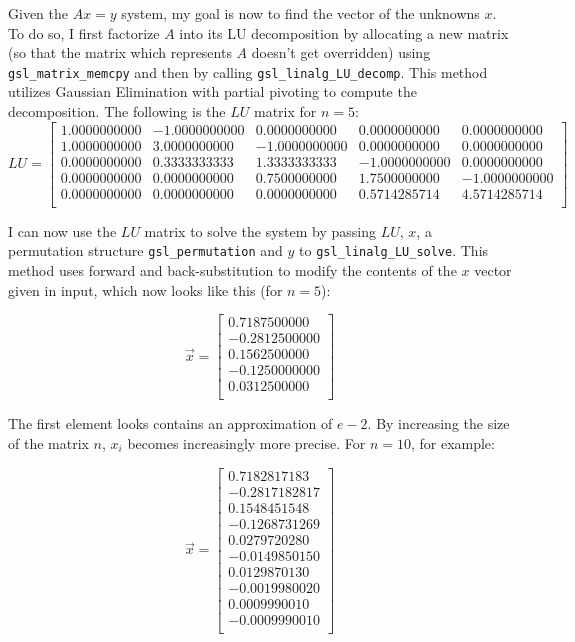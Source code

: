 \documentclass{article}
\newcommand{\code}{\texttt}
\begin{document}
Given the $Ax=y$ system, my goal is now to find the vector of the unknowns $x$. To do so, I first factorize $A$ into its LU decomposition by allocating a new matrix (so that the matrix which represents $A$ doesn't get overridden) using \code{gsl\_matrix\_memcpy} and then by calling \code{gsl\_linalg\_LU\_decomp}. This method utilizes Gaussian Elimination with partial pivoting to compute the decomposition. The following is the $LU$ matrix for $n=5$:
$$
LU=
\begin{bmatrix} 
1.0000000000 & -1.0000000000 & 0.0000000000 & 0.0000000000 & 0.0000000000\\ 
1.0000000000 & 3.0000000000 & -1.0000000000 & 0.0000000000 & 0.0000000000\\ 
0.0000000000 & 0.3333333333 & 1.3333333333 & -1.0000000000 & 0.0000000000\\ 
0.0000000000 & 0.0000000000 & 0.7500000000 & 1.7500000000 & -1.0000000000\\ 
0.0000000000 & 0.0000000000 & 0.0000000000 & 0.5714285714 & 4.5714285714\\
\end{bmatrix}
$$

I can now use the $LU$ matrix to solve the system by passing $LU$, $x$, a permutation structure \code{gsl\_permutation} and $y$ to \code{gsl\_linalg\_LU\_solve}. This method uses forward and back-substitution to modify the contents of the $x$ vector given in input, which now looks like this (for $n=5$):

$$
\vec{x}=
\begin{bmatrix}
0.7187500000\\
-0.2812500000\\
0.1562500000\\
-0.1250000000\\
0.0312500000\\
\end{bmatrix}
$$

The first element looks contains an approximation of $e-2$. By increasing the size of the matrix $n$, $x_i$ becomes increasingly more precise. For $n=10$, for example:

$$
\vec{x}=
\begin{bmatrix}
0.7182817183\\
-0.2817182817\\
0.1548451548\\
-0.1268731269\\
0.0279720280\\
-0.0149850150\\
0.0129870130\\
-0.0019980020\\
0.0009990010\\
-0.0009990010\\
\end{bmatrix}
$$
\end{document}
